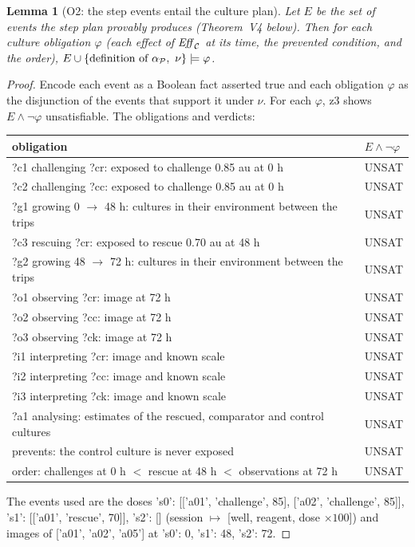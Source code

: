 \documentclass[10pt,a4paper]{article}
\theoremstyle{plain}\newtheorem{theorem}{Theorem}\newtheorem{lemma}{Lemma}\newtheorem{corollary}{Corollary}
\theoremstyle{definition}\newtheorem{definition}{Definition}\newtheorem{assumption}{Assumption}
\theoremstyle{remark}\newtheorem*{remark}{Remark}
\begin{document}
\begin{lemma}[O2: the step events entail the culture plan]\label{lem:abs}
Let $E$ be the set of events the step plan provably produces (Theorem~V4 below). Then for each culture obligation
$\varphi$ (each effect of $\mathit{Eff}_{\mathcal{C}}$ at its time, the prevented condition, and the order),
$E \cup \{\text{definition of }\alpha_{\mathcal{P}},\ \nu\} \models \varphi$.
\end{lemma}
\begin{proof}
Encode each event as a Boolean fact asserted true and each obligation $\varphi$ as the disjunction of the events that
support it under $\nu$. For each $\varphi$, z3 shows $E \wedge \neg\varphi$ unsatisfiable. The obligations and verdicts:
\begin{center}\small\begin{tabularx}{\linewidth}{@{}Xl@{}}\toprule obligation & $E \wedge \neg\varphi$ \\\midrule
?c1 challenging ?cr: exposed to challenge 0.85 au at 0 h & UNSAT \\
?c2 challenging ?cc: exposed to challenge 0.85 au at 0 h & UNSAT \\
?g1 growing 0 $\to$ 48 h: cultures in their environment between the trips & UNSAT \\
?c3 rescuing ?cr: exposed to rescue 0.70 au at 48 h & UNSAT \\
?g2 growing 48 $\to$ 72 h: cultures in their environment between the trips & UNSAT \\
?o1 observing ?cr: image at 72 h & UNSAT \\
?o2 observing ?cc: image at 72 h & UNSAT \\
?o3 observing ?ck: image at 72 h & UNSAT \\
?i1 interpreting ?cr: image and known scale & UNSAT \\
?i2 interpreting ?cc: image and known scale & UNSAT \\
?i3 interpreting ?ck: image and known scale & UNSAT \\
?a1 analysing: estimates of the rescued, comparator and control cultures & UNSAT \\
prevents: the control culture is never exposed & UNSAT \\
order: challenges at 0 h $<$ rescue at 48 h $<$ observations at 72 h & UNSAT
\\\bottomrule\end{tabularx}\end{center}
The events used are the doses {'s0': [['a01', 'challenge', 85], ['a02', 'challenge', 85]], 's1': [['a01', 'rescue', 70]], 's2': []} (session $\mapsto$ [well, reagent, dose $\times 100$]) and
images of ['a01', 'a02', 'a05'] at {'s0': 0, 's1': 48, 's2': 72}.
\end{proof}
\end{document}
